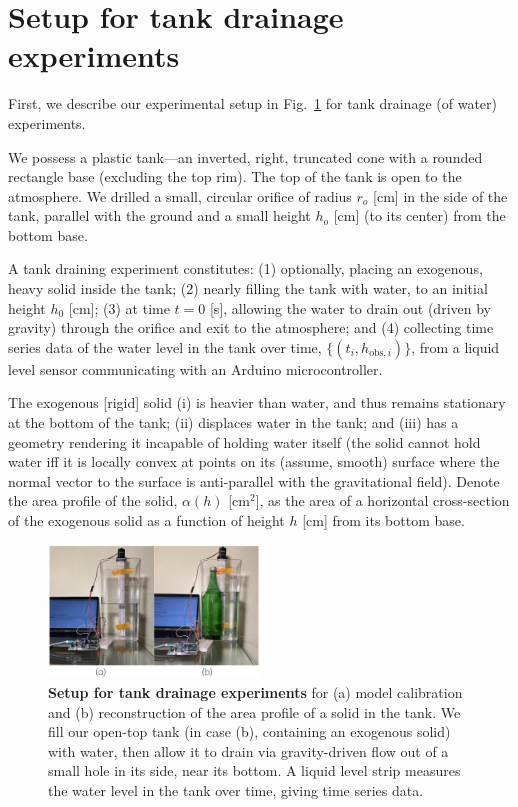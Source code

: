\documentclass[a4paper,fleqn]{cas-dc}
\begin{document}
\section{Setup for tank drainage experiments} \label{sec:expt}
First, we describe our experimental setup in Fig.~\ref{fig:photo_of_tank} for tank drainage (of water) experiments.

We possess a plastic tank---an inverted, right, truncated cone with a rounded rectangle base (excluding the top rim). The top of the tank is open to the atmosphere.
We drilled a small, circular orifice of radius $r_o$ [cm] in the side of the tank, parallel with the ground and a small height $h_o$ [cm] (to its center) from the bottom base.

A tank draining experiment constitutes: 
(1) optionally, placing an exogenous, heavy solid inside the tank; 
(2) nearly filling the tank with water, to an initial height $h_0$ [cm]; 
(3) at time $t=0$ [s], allowing the water to drain out (driven by gravity) through the orifice and exit to the atmosphere; and 
(4) collecting time series data of the water level in the tank over time, $\{(t_i, h_{\text{obs}, i}) \}$, from a liquid level sensor communicating with an Arduino microcontroller. 

The exogenous [rigid] solid (i) is heavier than water, and thus remains stationary at the bottom of the tank; (ii) displaces water in the tank; and (iii) has a geometry rendering it incapable of holding water itself (the solid cannot hold water iff it is locally convex at points on its (assume, smooth) surface where the normal vector to the surface is anti-parallel with the gravitational field). Denote the area profile of the solid, $\alpha(h)$ [cm$^2$], as the area of a horizontal cross-section of the exogenous solid as a function of height $h$ [cm] from its bottom base.

\begin{figure}[h!]
\begin{center}
	\includegraphics[width=0.5\textwidth]{real_expt.png}
	\caption{\textbf{Setup for tank drainage experiments} for (a) model calibration and (b) reconstruction of the area profile of a solid in the tank.
	We fill our open-top tank (in case (b), containing an exogenous solid) with water, then allow it to drain via gravity-driven flow out of a small hole in its side, near its bottom. A liquid level strip measures the water level in the tank over time, giving time series data.
	}
	\label{fig:photo_of_tank}
\end{center}
\end{figure}
\end{document}
